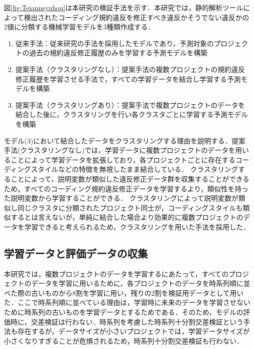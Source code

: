 \documentclass[submit,noauthor,ses,dvipdfmx]{ipsj}
\begin{document}
図\ref{fig:Teiannsyuhou}は本研究の検証手法を示す．本研究では，静的解析ツールによって検出されたコーディング規約違反を修正すべき違反かそうでない違反かの2値に分類する機械学習モデルを3種類作成する．%

\begin{enumerate}
  \item 従来手法：従来研究の手法を採用したモデルであり，予測対象のプロジェクトの過去の規約違反修正履歴のみを学習する予測モデルを構築
  \item 提案手法（クラスタリングなし）：提案手法の複数プロジェクトの規約違反修正履歴を学習させる手法で，すべての学習データを結合し学習する予測モデルを構築
  \item 提案手法（クラスタリングあり）：提案手法で複数プロジェクトのデータを結合した後に，クラスタリングを行い各クラスタごとに学習する予測モデルを構築
\end{enumerate}


モデル(3)において結合したデータをクラスタリングする理由を説明する．提案手法(クラスタリングなし)では，学習データに複数プロジェクトのデータを用いることによって学習データを拡張しており，各プロジェクトごとに存在するコーディングスタイルなどの特徴を無視したまま結合している．
クラスタリングすることによって，説明変数が類似した違反修正データ群を収集することができるため，すべてのコーディング規約違反修正データを学習するより，類似性を持った説明変数から学習することができる．
クラスタリングによって説明変数が類似し同じクラスタに分類されたプロジェクト同士が，コーディングスタイルも類似するとは言えないが，単純に結合した場合より効果的に複数プロジェクトのデータを学習できると考えられるため，クラスタリングを用いた手法を採用した．



\subsection{学習データと評価データの収集}

本研究では，複数プロジェクトのデータを学習するにあたって，すべてのプロジェクトのデータを学習に用いるために，各プロジェクトのデータを時系列順に並べた際の古いものから8割を学習に用い，残りの2割を検証用データとして用いた．ここで時系列順に並べている理由は，学習時に未来のデータを学習させないために時系列の古いものを学習データとするためである．そのため，モデルの評価時に，交差検証は行わない．時系列を考慮した時系列十分割交差検証という手法も存在するが，データサイズが小さいプロジェクトでは，学習データサイズが小さくなりすぎることが危惧されるため，時系列十分割交差検証も行わない．
\end{document}

